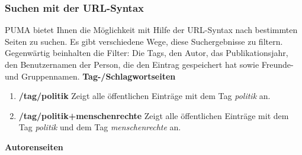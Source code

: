 \documentclass[b5paper,11pt,twoside]{scrbook} %
\begin{document}
\subsubsection{Suchen mit der URL-Syntax}
PUMA bietet Ihnen die Möglichkeit mit Hilfe der URL-Syntax nach bestimmten Seiten zu suchen. Es gibt verschiedene Wege, diese Suchergebnisse zu filtern. Gegenwärtig beinhalten die Filter: Die Tags, den Autor, das Publikationsjahr, den Benutzernamen der Person, die den Eintrag gespeichert hat sowie Freunde- und Gruppennamen. \newline
\newline
\textbf{Tag-/Schlagwortseiten}
\begin{enumerate}
    \item \textbf{/tag/politik} \newline
    Zeigt alle öffentlichen Einträge mit dem Tag \textit{politik} an.
    \item \textbf{/tag/politik+menschenrechte}\newline
    Zeigt alle öffentlichen Einträge mit dem Tag \textit{politik} und dem Tag \textit{menschenrechte} an.
\end{enumerate}
\textbf{Autorenseiten}
\end{document}
